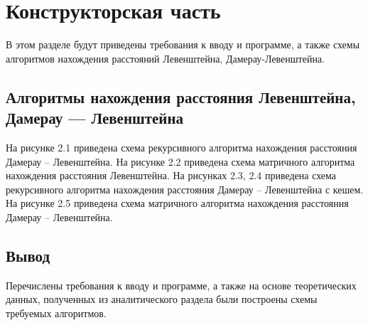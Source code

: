 \chapter{Конструкторская часть}
В этом разделе будут приведены требования к вводу и программе, а также схемы алгоритмов нахождения расстояний Левенштейна, Дамерау-Левенштейна.

\section{Алгоритмы нахождения расстояния Левенштейна, Дамерау — Левенштейна}

На рисунке 2.1 приведена схема рекурсивного алгоритма нахождения расстояния Дамерау -- Левенштейна.
На рисунке 2.2 приведена схема матричного алгоритма нахождения расстояния Левенштейна.
На рисунках 2.3, 2.4 приведена схема рекурсивного алгоритма нахождения расстояния Дамерау -- Левенштейна с кешем.
На рисунке 2.5 приведена схема матричного алгоритма нахождения расстояния Дамерау -- Левенштейна.


\newpage
\section*{Вывод}
Перечислены требования к вводу и программе, а также на основе теоретических данных, полученных из аналитического раздела были построены схемы требуемых алгоритмов.


